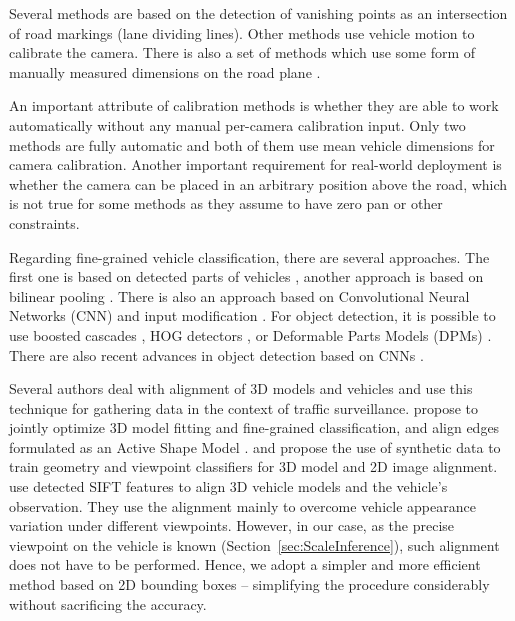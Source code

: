 \documentclass[]{elsarticle}
\begin{document}
Several methods \citep{He2007,Cathey2005,Grammatikopoulos2005} are based on the detection of vanishing points as an intersection of road markings (lane dividing lines). Other methods \citep{Dubska2014,Dubska2015ITS,Schoepflin2003,Dailey2000} use vehicle motion to calibrate the camera. There is also a set of methods which use some form of manually measured dimensions on the road plane \citep{Maduro2008,Nurhadiyatna2013,Sina2013,Luvizon2014,Luvizon2016,Do2015,Lan2014}.

An important attribute of calibration methods is whether they are able to work automatically without any manual per-camera calibration input. Only two methods \citep{Dailey2000,Dubska2014} are fully automatic and both of them use mean vehicle dimensions for camera calibration. Another important requirement for real-world deployment is whether the camera can be placed in an arbitrary position above the road, which is not true for some methods as they assume to have zero pan or other constraints. 





Regarding fine-grained vehicle classification, there are several approaches. The first one is based on detected parts of vehicles \citep{Krause2015,Simon2015,Fang2016}, another approach is based on bilinear pooling \citep{Lin2015Bilinear,Gao2016}. There is also an approach based on Convolutional Neural Networks (CNN) and input modification \citep{Sochor2016}. 
For object detection, it is possible to use boosted cascades \citep{Dollar2014}, HOG detectors \citep{Dalal2005}, or Deformable Parts Models (DPMs) \citep{Felzenszwalb2010}. There are also recent advances in object detection based on CNNs \citep{Girshick2014,Girshick2015,Liu2016SSD}.


Several authors deal with alignment of 3D models and vehicles and use this technique for gathering data in the context of traffic surveillance. \cite{Lin2014} propose to jointly optimize 3D model fitting and fine-grained classification, and \cite{Hsiao2014} align edges formulated as an Active Shape Model \citep{Cootes1995,Li2009}. \cite{Krause2013} and propose the use of synthetic data to train geometry and viewpoint classifiers for 3D model and 2D image alignment.
\cite{Prokaj2009} use detected SIFT features \citep{Lowe1999} to align 3D vehicle models and the vehicle's observation.  They use the alignment mainly to overcome vehicle appearance variation under different viewpoints. However, in our case, as the precise viewpoint on the vehicle is known (Section~\ref{sec:ScaleInference}), such alignment does not have to be performed.  Hence, we adopt a simpler and more efficient method based on 2D bounding boxes -- simplifying the procedure considerably without sacrificing the accuracy. 
\end{document}
